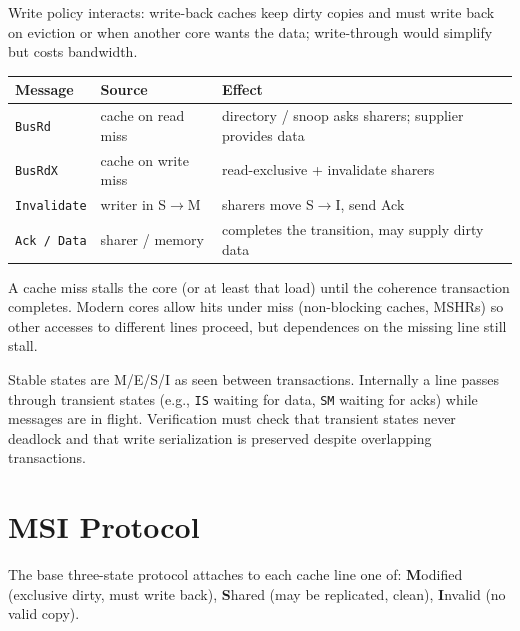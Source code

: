 Write policy interacts: write-back caches keep dirty copies and must write back on eviction or when another core wants the data; write-through would simplify but costs bandwidth.

\begin{center}
\begin{tabular}{llp{7cm}}
\toprule Message & Source & Effect \\ \midrule
\texttt{BusRd} & cache on read miss & directory / snoop asks sharers; supplier provides data \\
\texttt{BusRdX} & cache on write miss & read-exclusive + invalidate sharers \\
\texttt{Invalidate} & writer in S$\to$M & sharers move S$\to$I, send Ack \\
\texttt{Ack / Data} & sharer / memory & completes the transition, may supply dirty data \\ \bottomrule
\end{tabular}
\end{center}

A cache miss stalls the core (or at least that load) until the coherence transaction completes. Modern cores allow hits under miss (non-blocking caches, MSHRs) so other accesses to different lines proceed, but dependences on the missing line still stall.

\begin{definition}
Stable states are M/E/S/I as seen between transactions. Internally a line passes through transient states (e.g., \texttt{IS} waiting for data, \texttt{SM} waiting for acks) while messages are in flight. Verification must check that transient states never deadlock and that write serialization is preserved despite overlapping transactions.
\end{definition}

\section{MSI Protocol}
The base three-state protocol attaches to each cache line one of: \textbf{M}odified (exclusive dirty, must write back), \textbf{S}hared (may be replicated, clean), \textbf{I}nvalid (no valid copy).

